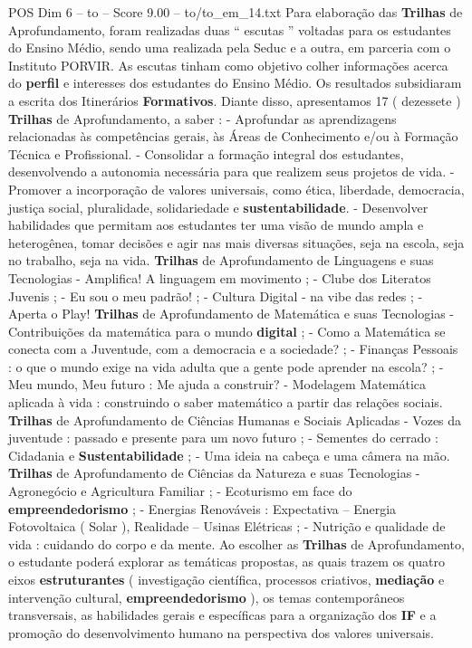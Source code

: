 \begin{textsample}{POS Dim 6 – to – Score 9.00 – to/to\_em\_14.txt}
Para elaboração das \textbf{Trilhas} de Aprofundamento, foram realizadas duas “ escutas ” voltadas para os estudantes do Ensino Médio, sendo uma realizada pela Seduc e a outra, em parceria com o Instituto PORVIR.
As escutas tinham como objetivo colher informações acerca do \textbf{perfil} e interesses dos estudantes do Ensino Médio.
Os resultados subsidiaram a escrita dos Itinerários \textbf{Formativos}.
Diante disso, apresentamos 17 ( dezessete ) \textbf{Trilhas} de Aprofundamento, a saber : - Aprofundar as aprendizagens relacionadas às competências gerais, às Áreas de Conhecimento e/ou à Formação Técnica e Profissional. - Consolidar a formação integral dos estudantes, desenvolvendo a autonomia necessária para que realizem seus projetos de vida. - Promover a incorporação de valores universais, como ética, liberdade, democracia, justiça social, pluralidade, solidariedade e \textbf{sustentabilidade}. - Desenvolver habilidades que permitam aos estudantes ter uma visão de mundo ampla e heterogênea, tomar decisões e agir nas mais diversas situações, seja na escola, seja no trabalho, seja na vida. \textbf{Trilhas} de Aprofundamento de Linguagens e suas Tecnologias - Amplifica!
A linguagem em movimento ; - Clube dos Literatos Juvenis ; - Eu sou o meu padrão! ; - Cultura Digital - na vibe das redes ; - Aperta o Play! \textbf{Trilhas} de Aprofundamento de Matemática e suas Tecnologias - Contribuições da matemática para o mundo \textbf{digital} ; - Como a Matemática se conecta com a Juventude, com a democracia e a sociedade? ; - Finanças Pessoais : o que o mundo exige na vida adulta que a gente pode aprender na escola? ; - Meu mundo, Meu futuro : Me ajuda a construir? - Modelagem Matemática aplicada à vida : construindo o saber matemático a partir das relações sociais. \textbf{Trilhas} de Aprofundamento de Ciências Humanas e Sociais Aplicadas - Vozes da juventude : passado e presente para um novo futuro ; - Sementes do cerrado : Cidadania e \textbf{Sustentabilidade} ; - Uma ideia na cabeça e uma câmera na mão. \textbf{Trilhas} de Aprofundamento de Ciências da Natureza e suas Tecnologias - Agronegócio e Agricultura Familiar ; - Ecoturismo em face do \textbf{empreendedorismo} ; - Energias Renováveis : Expectativa – Energia Fotovoltaica ( Solar ), Realidade – Usinas Elétricas ; - Nutrição e qualidade de vida : cuidando do corpo e da mente.
Ao escolher as \textbf{Trilhas} de Aprofundamento, o estudante poderá explorar as temáticas propostas, as quais trazem os quatro eixos \textbf{estruturantes} ( investigação científica, processos criativos, \textbf{mediação} e intervenção cultural, \textbf{empreendedorismo} ), os temas contemporâneos transversais, as habilidades gerais e específicas para a organização dos \textbf{IF} e a promoção do desenvolvimento humano na perspectiva dos valores universais.

\end{textsample}
